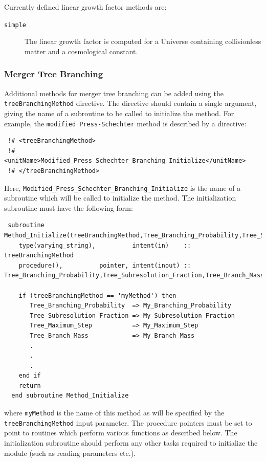 Currently defined linear growth factor methods are:
\begin{description}
 \item [{\tt simple}] The linear growth factor is computed for a Universe containing collisionless matter and a cosmological constant.
\end{description}

\subsubsection{Merger Tree Branching}

Additional methods for merger tree branching can be added using the {\tt treeBranchingMethod} directive. The directive should contain a single argument, giving the name of a subroutine to be called to initialize the method. For example, the {\tt modified Press-Schechter} method is described by a directive:
\begin{verbatim}
 !# <treeBranchingMethod>
 !#  <unitName>Modified_Press_Schechter_Branching_Initialize</unitName>
 !# </treeBranchingMethod>
\end{verbatim}
Here, {\tt Modified\_Press\_Schechter\_Branching\_Initialize} is the name of a subroutine which will be called to initialize the method. The initialization subroutine must have the following form:
\begin{verbatim}
 subroutine Method_Initialize(treeBranchingMethod,Tree_Branching_Probability,Tree_Subresolution_Fraction,Tree_Branch_Mass,Tree_Maximum_Step)
    type(varying_string),          intent(in)    :: treeBranchingMethod
    procedure(),          pointer, intent(inout) :: Tree_Branching_Probability,Tree_Subresolution_Fraction,Tree_Branch_Mass,Tree_Maximum_Step
    
    if (treeBranchingMethod == 'myMethod') then
       Tree_Branching_Probability  => My_Branching_Probability
       Tree_Subresolution_Fraction => My_Subresolution_Fraction
       Tree_Maximum_Step           => My_Maximum_Step
       Tree_Branch_Mass            => My_Branch_Mass
       .
       .
       .
    end if
    return
  end subroutine Method_Initialize
\end{verbatim}
where {\tt myMethod} is the name of this method as will be specified by the {\tt treeBranchingMethod} input parameter. The procedure pointers must be set to point to routines which perform various functions as described below. The initialization subroutine should perform any other tasks required to initialize the module (such as reading parameters etc.).

